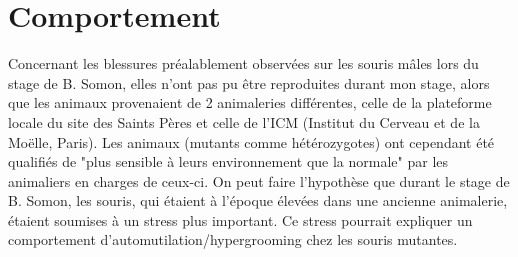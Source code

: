 \section{Comportement}
\label{sec:Comportement}
Concernant les blessures préalablement observées sur les souris \mcrd mâles lors du stage de B. Somon, elles n'ont pas pu être reproduites durant mon stage, alors que les animaux provenaient de 2 animaleries différentes, celle de la plateforme locale du site des Saints Pères et celle de l’ICM (Institut du Cerveau et de la Moëlle, Paris). Les animaux (mutants comme hétérozygotes) ont cependant été qualifiés de "plus sensible à leurs environnement que la normale" par les animaliers en charges de ceux-ci. On peut faire l'hypothèse que durant le stage de B. Somon, les souris, qui étaient à l'époque élevées dans une ancienne animalerie, étaient soumises à un stress plus important. Ce stress pourrait expliquer un comportement d'automutilation/hypergrooming chez les souris mutantes. 